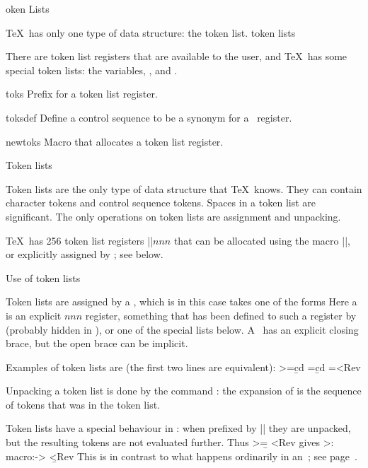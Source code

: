 \subject[token] Token Lists

\TeX\ has only one type of data structure: the token list.
\term token lists\par
There are token list registers that are available to the user,
and \TeX\ has some special token lists: the 
variables, , and .


\invent
\item toks 
      Prefix for a token list register.

\item toksdef 
      Define a control sequence to be a synonym for
      a~ register.

\item newtoks 
      Macro that allocates a token list register.

\inventstop

\point Token lists

Token lists are the only type of data structure that \TeX\ knows.
They can contain character tokens and control sequence tokens.
Spaces in a token list are significant.
The only operations on token lists are assignment and
unpacking.

\TeX\ has 256 token list registers \ver|\toks|$nnn$ that can be
allocated using the macro \ver|\newtoks|, or explicitly
assigned by ; see below.

\point Use of token lists

Token lists are  assigned by a ,
which is in this case takes one of the forms
\disp{}\nl
     \dispstop
Here a  is an explicit $nnn$
register, something that has been defined to such a register
by  (probably hidden in ),
or one of the special 
lists below.
A~ has an explicit closing brace, but the
open brace can be implicit.

Examples of token lists are (the first two lines are equivalent):
\Ver>=\bgroup \a \b cd}
={\a \b cd}
=<Rev

Unpacking a token list is done by the command :
the expansion of  is the 
sequence of tokens that was in the token list.

Token lists have a special behaviour in :
when prefixed by \ver|\the| they are unpacked, 
but the resulting tokens
are not evaluated further. Thus
\Ver>={\a \b} \edef\SomeCs{\the{}}<Rev
gives
\Ver>\SomeCs: macro:-> \a \b<Rev
This is in contrast to what happens ordinarily in an~;
see page~.


